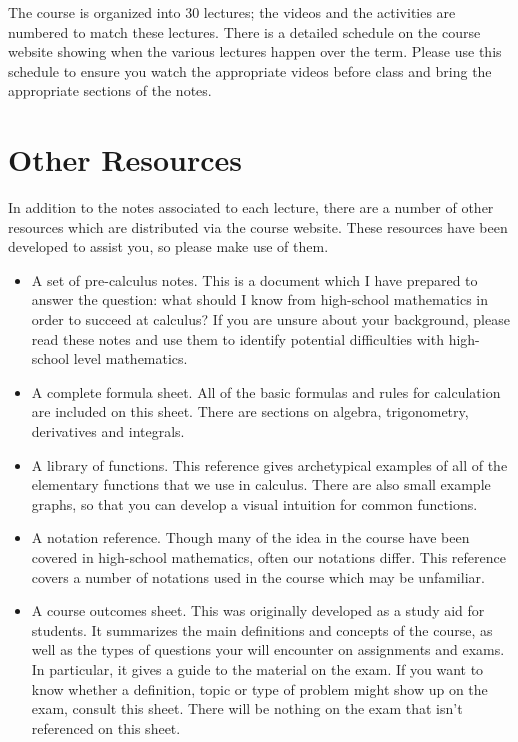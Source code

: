 \documentclass[fleqn]{report}
\begin{document}
The course is organized into 30 lectures; the videos and the
activities are numbered to match these lectures. There is a
detailed schedule on the course website showing when the
various lectures happen over the term. Please use this
schedule to ensure you watch the appropriate videos before
class and bring the appropriate sections of the notes.
\clearpage

\section*{Other Resources}

In addition to the notes associated to each lecture, there are
a number of other resources which are distributed via
the course website. These resources have been developed to
assist you, so please make use of them. 

\begin{itemize}
\item A set of pre-calculus notes. This is a document
which I have prepared to answer the question: what should I
know from high-school mathematics in order to succeed at
calculus? If you are unsure about your background, please
read these notes and use them to identify potential
difficulties with high-school level mathematics. 
\item A complete formula sheet. All of the basic formulas and
rules for calculation are included on this sheet. There are
sections on algebra, trigonometry, derivatives and integrals.
\item A library of functions. This reference gives
archetypical examples of all of the elementary functions that
we use in calculus. There are also small example graphs, so
that you can develop a visual intuition for common functions.
\item A notation reference. Though many of the idea in the
course have been covered in high-school mathematics, often our
notations differ. This reference covers a number of notations
used in the course which may be unfamiliar. 
\item A course outcomes sheet. This was originally
developed as a study aid for students. It summarizes the main
definitions and concepts of the course, as well as the types
of questions your will encounter on assignments and exams. In
particular, it gives a guide to the material on the exam. If
you want to know whether a definition, topic or type of
problem might show up on the exam, consult this sheet. There
will be nothing on the exam that isn't referenced on this
sheet.
\end{itemize}
\end{document}
